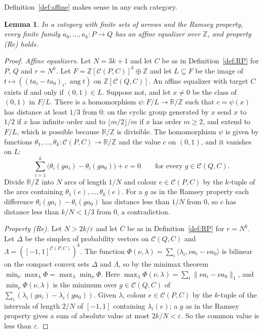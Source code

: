 \documentclass[11pt,a4paper]{article}
\newtheorem{lemma}[theorem]{Lemma}
\theoremstyle{definition}
\newcommand{\C}{\mathcal{C}}
\newcommand{\Z}{\mathbb{Z}}
\newcommand{\R}{\mathbb{R}}
\newcommand{\aug}{\operatorname{aug}}
\begin{document}
Definition~\ref{def:affine} makes sense in any such category.

\begin{lemma}\label{lem:ramsey}
In a category with finite sets of arrows and the Ramsey property, every
finite family $a_0,\dots,a_k\colon P\to Q$ has an affine equalizer over $\Z$,
and property \textup{(Re)} holds.
\end{lemma}

\begin{proof}
\emph{Affine equalizers.} Let $N=3k+1$ and let $C$ be as in
Definition~\ref{def:RP} for $P$, $Q$ and $r=N^k$. Let
$F=\Z[\C(P,C)]^k\oplus\Z$ and let $L\subseteq F$ be the image of
$t\mapsto((ta_i-ta_0)_i,\aug t)$ on $\Z[\C(Q,C)]$. An affine equalizer with
target $C$ exists if and only if $(0,1)\in L$. Suppose not, and let $x\ne0$
be the class of $(0,1)$ in $F/L$. There is a homomorphism
$\psi\colon F/L\to\R/\Z$ such that $c=\psi(x)$ has distance at least $1/3$
from $0$: on the cyclic group generated by $x$ send $x$ to $1/2$ if $x$ has
infinite order and to $\lfloor m/2\rfloor/m$ if $x$ has order $m\ge2$, and
extend to $F/L$, which is possible because $\R/\Z$ is divisible. The
homomorphism $\psi$ is given by functions
$\theta_1,\dots,\theta_k\colon\C(P,C)\to\R/\Z$ and the value $c$ on $(0,1)$,
and it vanishes on $L$:
\[
 \sum_{i=1}^k\bigl(\theta_i(ga_i)-\theta_i(ga_0)\bigr)+c=0
 \qquad\text{for every }g\in\C(Q,C).
\]
Divide $\R/\Z$ into $N$ arcs of length $1/N$ and colour $e\in\C(P,C)$ by the
$k$-tuple of the arcs containing $\theta_1(e),\dots,\theta_k(e)$. For a $g$
as in the Ramsey property each difference $\theta_i(ga_i)-\theta_i(ga_0)$
has distance less than $1/N$ from $0$, so $c$ has distance less than
$k/N<1/3$ from $0$, a contradiction.

\emph{Property \textup{(Re)}.} Let $N>2k/\varepsilon$ and let $C$ be as in
Definition~\ref{def:RP} for $r=N^k$. Let $\Delta$ be the simplex of
probability vectors on $\C(Q,C)$ and
$\Lambda=([-1,1]^{\C(P,C)})^k$. The function
$\Phi(\nu,\lambda)=\sum_i\langle\lambda_i,\nu a_i-\nu a_0\rangle$ is bilinear
on the compact convex sets $\Delta$ and $\Lambda$, so by the minimax theorem
\cite{vN} $\min_\nu\max_\lambda\Phi=\max_\lambda\min_\nu\Phi$. Here
$\max_\lambda\Phi(\nu,\lambda)=\sum_i\|\nu a_i-\nu a_0\|_1$, and
$\min_\nu\Phi(\nu,\lambda)$ is the minimum over $g\in\C(Q,C)$ of
$\sum_i(\lambda_i(ga_i)-\lambda_i(ga_0))$. Given $\lambda$, colour
$e\in\C(P,C)$ by the $k$-tuple of the intervals of length $2/N$ of $[-1,1]$
containing $\lambda_i(e)$; a $g$ as in the Ramsey property gives a sum of
absolute value at most $2k/N<\varepsilon$. So the common value is less than
$\varepsilon$.
\end{proof}
\end{document}
